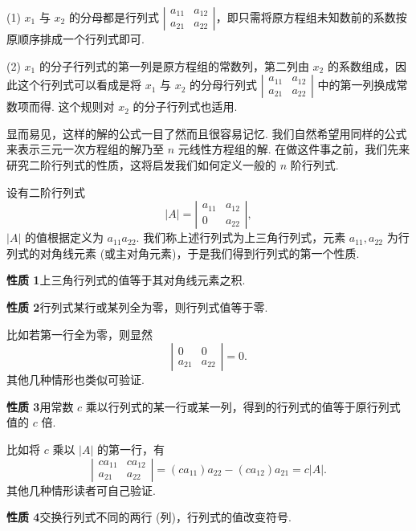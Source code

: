 \documentclass[UTF8,12pt,a4paper,fontset=fandol]{ctexart}
\begin{document}
(1) $x_1$ 与 $x_2$ 的分母都是行列式 $\left|\begin{array}{cc}a_{11}&a_{12}\\a_{21}&a_{22}\end{array}\right|$，即只需将原方程组未知数前的系数按原顺序排成一个行列式即可.

(2) $x_1$ 的分子行列式的第一列是原方程组的常数列，第二列由 $x_2$ 的系数组成，因此这个行列式可以看成是将 $x_1$ 与 $x_2$ 的分母行列式 $\left|\begin{array}{cc}a_{11}&a_{12}\\a_{21}&a_{22}\end{array}\right|$ 中的第一列换成常数项而得. 这个规则对 $x_2$ 的分子行列式也适用.

显而易见，这样的解的公式一目了然而且很容易记忆. 我们自然希望用同样的公式来表示三元一次方程组的解乃至 $n$ 元线性方程组的解. 在做这件事之前，我们先来研究二阶行列式的性质，这将启发我们如何定义一般的 $n$ 阶行列式.

设有二阶行列式
\[
|A|=\left|\begin{array}{cc}
a_{11} & a_{12}\\
0 & a_{22}
\end{array}\right|,
\]
$|A|$ 的值根据定义为 $a_{11}a_{22}$. 我们称上述行列式为上三角行列式，元素 $a_{11},a_{22}$ 为行列式的对角线元素 (或主对角元素)，于是我们得到行列式的第一个性质.

\noindent\textbf{性质 1}\quad 上三角行列式的值等于其对角线元素之积.

\noindent\textbf{性质 2}\quad 行列式某行或某列全为零，则行列式值等于零.

比如若第一行全为零，则显然
\[
\left|\begin{array}{cc}
0 & 0\\
a_{21} & a_{22}
\end{array}\right|=0.
\]
其他几种情形也类似可验证.

\noindent\textbf{性质 3}\quad 用常数 $c$ 乘以行列式的某一行或某一列，得到的行列式的值等于原行列式值的 $c$ 倍.

比如将 $c$ 乘以 $|A|$ 的第一行，有
\[
\left|\begin{array}{cc}
ca_{11} & ca_{12}\\
a_{21} & a_{22}
\end{array}\right|
=(ca_{11})a_{22}-(ca_{12})a_{21}=c|A|.
\]
其他几种情形读者可自己验证.

\noindent\textbf{性质 4}\quad 交换行列式不同的两行 (列)，行列式的值改变符号.
\end{document}
